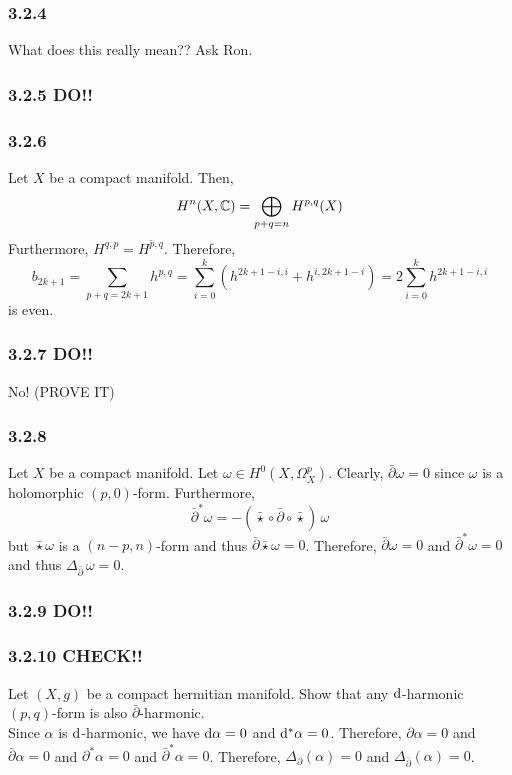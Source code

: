 \documentclass[12pt]{article}
\begin{document}
\subsubsection{3.2.4}
What does this really mean?? Ask Ron.

\subsubsection{3.2.5 DO!!}

\subsubsection{3.2.6}

Let $X$ be a compact \kahler manifold. Then,
\[ H^{n}(X, \mathbb{C}) = \bigoplus_{p + q = n} H^{p,q}(X) \]
Furthermore, $H^{q,p} = \overline{H^{p,q}}$. Therefore,
\[ b_{2k + 1} = \sum_{p + q = 2k + 1} h^{p, q} = \sum_{i = 0}^k (h^{2 k + 1 - i, i} + h^{i, 2k + 1 - i}) = 2 \sum_{i = 0}^k h^{2k + 1 - i, i} \]
is even.

\subsubsection{3.2.7 DO!!}

No! (PROVE IT)

\subsubsection{3.2.8}

Let $X$ be a compact \kahler manifold. Let $\omega \in H^0(X, \Omega^p_X)$. Clearly, $\bar{\partial} \omega = 0$ since $\omega$ is a holomorphic $(p, 0)$-form. Furthermore, 
\[ \bar{\partial}^* \omega = - (\bar{\star} \circ \bar{\partial} \circ \bar{\star}) \, \omega \]
but $\bar{\star} \omega$ is a $(n - p, n)$-form and thus $\bar{\partial} \bar{\star} \omega = 0$. Therefore, $\bar{\partial} \omega = 0$ and $\bar{\partial}^* \omega = 0$ and thus $\Delta_{\bar{\partial}} \, \omega = 0$.


\subsubsection{3.2.9 DO!!}

\subsubsection{3.2.10 CHECK!!}

Let $(X, g)$ be a compact hermitian manifold. Show that any $\mathrm{d}$-harmonic $(p,q)$-form is also $\bar{\partial}$-harmonic.
\bigskip\\
Since $\alpha$ is $\mathrm{d}$-harmonic, we have $\mathrm{d}{\alpha} = 0$ and $\mathrm{d}^*{\alpha} = 0$. Therefore, $\partial \alpha = 0$ and $\bar{\partial} \alpha = 0$ and $\partial^* \alpha = 0$ and $\bar{\partial}^* \alpha = 0$. Therefore, $\Delta_{\partial} (\alpha) = 0$ and $\Delta_{\bar{\partial}} (\alpha) = 0$.
\end{document}
